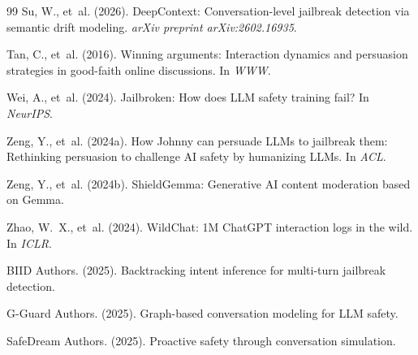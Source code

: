 \documentclass[11pt]{article}
\begin{document}
\begin{thebibliography}{99}
Su, W., et~al. (2026).
\newblock DeepContext: Conversation-level jailbreak detection via semantic drift modeling.
\newblock \emph{arXiv preprint arXiv:2602.16935}.

Tan, C., et~al. (2016).
\newblock Winning arguments: Interaction dynamics and persuasion strategies in good-faith online discussions.
\newblock In \emph{WWW}.

Wei, A., et~al. (2024).
\newblock Jailbroken: How does LLM safety training fail?
\newblock In \emph{NeurIPS}.

Zeng, Y., et~al. (2024a).
\newblock How Johnny can persuade LLMs to jailbreak them: Rethinking persuasion to challenge AI safety by humanizing LLMs.
\newblock In \emph{ACL}.

Zeng, Y., et~al. (2024b).
\newblock ShieldGemma: Generative AI content moderation based on Gemma.

Zhao, W.~X., et~al. (2024).
\newblock WildChat: 1M ChatGPT interaction logs in the wild.
\newblock In \emph{ICLR}.

{BIID Authors}. (2025).
\newblock Backtracking intent inference for multi-turn jailbreak detection.

{G-Guard Authors}. (2025).
\newblock Graph-based conversation modeling for LLM safety.

{SafeDream Authors}. (2025).
\newblock Proactive safety through conversation simulation.

\end{thebibliography}
\end{document}
